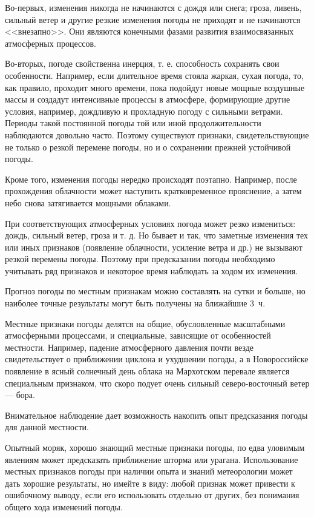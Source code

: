 Во-первых, изменения никогда не начинаются с дождя или снега; гроза,
ливень, сильный ветер и другие резкие изменения погоды не приходят и
не начинаются <<внезапно>>. Они являются конечными фазами развития
взаимосвязанных атмосферных процессов.

Во-вторых, погоде свойственна инерция, т. е. способность сохранять
свои особенности. Например, если длительное время стояла жаркая, сухая
погода, то, как правило, проходит много времени, пока подойдут новые
мощные воздушные массы и создадут интенсивные процессы в атмосфере,
формирующие другие условия, например, дождливую и прохладную погоду с
сильными ветрами. Периоды такой постоянной погоды той или иной
продолжительности наблюдаются довольно часто. Поэтому существуют
признаки, свидетельствующие не только о резкой перемене погоды, но и о
сохранении прежней устойчивой погоды.

Кроме того, изменения погоды нередко происходят поэтапно. Например,
после прохождения облачности может наступить кратковременное
прояснение, а затем небо снова затягивается мощными облаками.

При соответствующих атмосферных условиях погода может резко
измениться: дождь, сильный ветер, гроза и т. д. Но бывает и так, что
заметные изменения тех или иных признаков (появление облачности,
усиление ветра и др.) не вызывают резкой перемены погоды. Поэтому при
предсказании погоды необходимо учитывать ряд признаков и некоторое
время наблюдать за ходом их изменения.

Прогноз погоды по местным признакам можно составлять на сутки и
больше, но наиболее точные результаты могут быть получены на ближайшие
3~ч.

Местные признаки погоды делятся на общие, обусловленные масштабными
атмосферными процессами, и специальные, зависящие от особенностей
местности. Например, падение атмосферного давления почти везде
свидетельствует о приближении циклона и ухудшении погоды, а в
Новороссийске появление в ясный солнечный день облака на Мархотском
перевале является специальным признаком, что скоро подует очень
сильный северо-восточный ветер --- бора.

Внимательное наблюдение дает возможность накопить опыт предсказания
погоды для данной местности.

Опытный моряк, хорошо знающий местные признаки погоды, по едва
уловимым явлениям может предсказать приближение шторма или
урагана. Использование местных признаков погоды при наличии опыта и
знаний метеорологии может дать хорошие результаты, но имейте в виду:
любой признак может привести к ошибочному выводу, если его
использовать отдельно от других, без понимания общего хода изменений
погоды.

